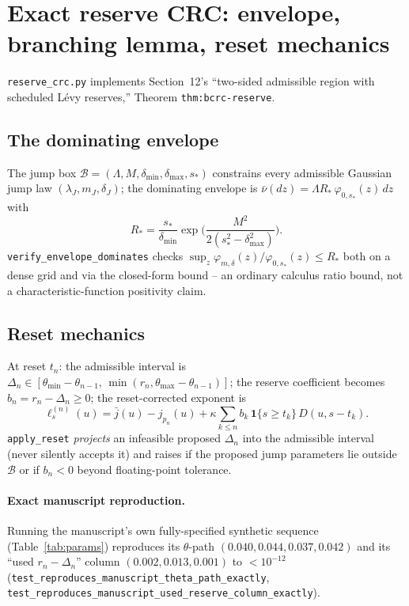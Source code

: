 \section{Exact reserve CRC: envelope, branching lemma, reset mechanics}
\label{sec:reserve}

\texttt{reserve\_crc.py} implements Section~12's ``two-sided admissible
region with scheduled L\'evy reserves,'' Theorem \texttt{thm:bcrc-reserve}.

\subsection{The dominating envelope}
The jump box $\mathcal B=(\Lambda,M,\delta_{\min},\delta_{\max},s_*)$
constrains every admissible Gaussian jump law $(\lambda_J,m_J,\delta_J)$;
the dominating envelope is $\bar\nu(dz)=\Lambda R_*\,\varphi_{0,s_*}(z)\,dz$
with
\[
  R_*=\frac{s_*}{\delta_{\min}}\exp\!\Big(\frac{M^2}{2(s_*^2-\delta_{\max}^2)}\Big).
\]
\texttt{verify\_envelope\_dominates} checks
$\sup_z\varphi_{m,\delta}(z)/\varphi_{0,s_*}(z)\le R_*$ both on a dense grid
and via the closed-form bound -- an ordinary calculus ratio bound, not a
characteristic-function positivity claim.

\subsection{Reset mechanics}
At reset $t_n$: the admissible interval is
$\Delta_n\in[\theta_{\min}-\theta_{n-1},\,\min(r_n,\theta_{\max}-\theta_{n-1})]$;
the reserve coefficient becomes $b_n=r_n-\Delta_n\ge0$; the reset-corrected
exponent is
\[
  \ell_s^{(n)}(u)=\bar j(u)-j_{p_n}(u)+\kappa\sum_{k\le n} b_k\,\mathbf 1\{s\ge t_k\}\,D(u,s-t_k).
\]
\texttt{apply\_reset} \emph{projects} an infeasible proposed $\Delta_n$ into
the admissible interval (never silently accepts it) and raises if the
proposed jump parameters lie outside $\mathcal B$ or if $b_n<0$ beyond
floating-point tolerance.

\paragraph{Exact manuscript reproduction.} Running the manuscript's own
fully-specified synthetic sequence (Table~\ref{tab:params}) reproduces its
$\theta$-path $(0.040,0.044,0.037,0.042)$ and its ``used $r_n-\Delta_n$''
column $(0.002,0.013,0.001)$ to $<10^{-12}$
(\texttt{test\_reproduces\_manuscript\_theta\_path\_exactly},
\texttt{test\_reproduces\_manuscript\_used\_reserve\_column\_exactly}).

